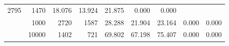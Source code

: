 \begin{table}
\begin{tabular}{rrrrrrrrr}
							     2795  & 1470  
	                           & 18.076 & 13.924 & 21.875
	                           & 0.000 & 0.000  \\
	                
	            
					 &  
					 
					\multirow{ 1 }{*}{ 1000 } &
					
						
							    
							     2720  & 1587  
	                           & 28.288 & 21.904 & 23.164
	                           & 0.000 & 0.000  \\
	                
	            
					 &  
					 
					\multirow{ 1 }{*}{ 10000 } &
					
						
							    
							     1402  & 721  
	                           & 69.802 & 67.198 & 75.407
	                           & 0.000 & 0.000  \\
	                
	            
	        

\hline

\end{tabular}
\end{table}
\clearpage


	    

